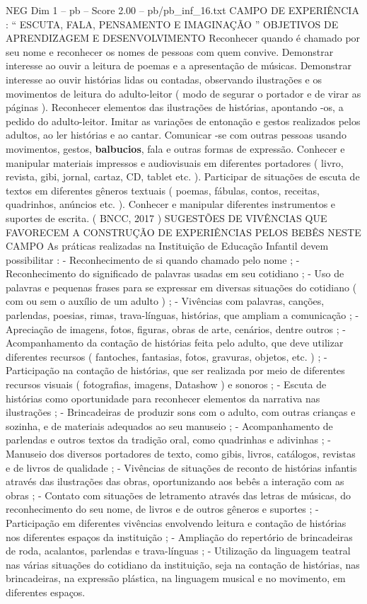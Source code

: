 \begin{textsample}{NEG Dim 1 – pb – Score 2.00 – pb/pb\_inf\_16.txt}  \label{ex:f1_neg_144}
CAMPO DE EXPERIÊNCIA : “ ESCUTA, FALA, PENSAMENTO E IMAGINAÇÃO ” OBJETIVOS DE APRENDIZAGEM E DESENVOLVIMENTO Reconhecer quando é chamado por seu nome e reconhecer os nomes de pessoas com quem convive.
Demonstrar interesse ao ouvir a leitura de poemas e a apresentação de músicas.
Demonstrar interesse ao ouvir histórias lidas ou contadas, observando ilustrações e os movimentos de leitura do adulto-leitor ( modo de segurar o portador e de virar as páginas ).
Reconhecer elementos das ilustrações de histórias, apontando -os, a pedido do adulto-leitor.
Imitar as variações de entonação e gestos realizados pelos adultos, ao ler histórias e ao cantar.
Comunicar -se com outras pessoas usando movimentos, gestos, \textbf{balbucios}, fala e outras formas de expressão.
Conhecer e manipular materiais impressos e audiovisuais em diferentes portadores ( livro, revista, gibi, jornal, cartaz, CD, tablet etc. ).
Participar de situações de escuta de textos em diferentes gêneros textuais ( poemas, fábulas, contos, receitas, quadrinhos, anúncios etc. ).
Conhecer e manipular diferentes instrumentos e suportes de escrita. ( BNCC, 2017 ) SUGESTÕES DE VIVÊNCIAS QUE FAVORECEM A CONSTRUÇÃO DE EXPERIÊNCIAS PELOS BEBÊS NESTE CAMPO As práticas realizadas na Instituição de Educação Infantil devem possibilitar : - Reconhecimento de si quando chamado pelo nome ; - Reconhecimento do significado de palavras usadas em seu cotidiano ; - Uso de palavras e pequenas frases para se expressar em diversas situações do cotidiano ( com ou sem o auxílio de um adulto ) ; - Vivências com palavras, canções, parlendas, poesias, rimas, trava-línguas, histórias, que ampliam a comunicação ; - Apreciação de imagens, fotos, figuras, obras de arte, cenários, dentre outros ; - Acompanhamento da contação de histórias feita pelo adulto, que deve utilizar diferentes recursos ( fantoches, fantasias, fotos, gravuras, objetos, etc. ) ; - Participação na contação de histórias, que ser realizada por meio de diferentes recursos visuais ( fotografias, imagens, Datashow ) e sonoros ; - Escuta de histórias como oportunidade para reconhecer elementos da narrativa nas ilustrações ; - Brincadeiras de produzir sons com o adulto, com outras crianças e sozinha, e de materiais adequados ao seu manuseio ; - Acompanhamento de parlendas e outros textos da tradição oral, como quadrinhas e adivinhas ; - Manuseio dos diversos portadores de texto, como gibis, livros, catálogos, revistas e de livros de qualidade ; - Vivências de situações de reconto de histórias infantis através das ilustrações das obras, oportunizando aos bebês a interação com as obras ; - Contato com situações de letramento através das letras de músicas, do reconhecimento do seu nome, de livros e de outros gêneros e suportes ; - Participação em diferentes vivências envolvendo leitura e contação de histórias nos diferentes espaços da instituição ; - Ampliação do repertório de brincadeiras de roda, acalantos, parlendas e trava-línguas ; - Utilização da linguagem teatral nas várias situações do cotidiano da instituição, seja na contação de histórias, nas brincadeiras, na expressão plástica, na linguagem musical e no movimento, em diferentes espaços.

\end{textsample}
